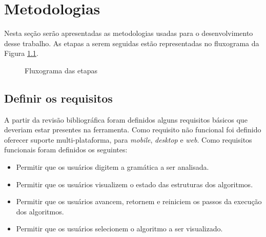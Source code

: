 \chapter{Metodologias}
\label{chap:metodologia}
Nesta seção serão apresentadas as metodologias usadas para o desenvolvimento desse trabalho. As etapas a serem seguidas estão representadas no fluxograma da Figura \ref{fig:etapas}.

\begin{figure}[ht]
  \centering
  \captionsetup{width=16cm}
  \caption{Fluxograma das etapas}
  \label{fig:etapas}
\end{figure}

\section{Definir os requisitos}
A partir da revisão bibliográfica foram definidos alguns requisitos básicos que deveriam estar presentes na ferramenta. Como requisito não funcional foi definido oferecer suporte multi-plataforma, para \textit{mobile}, \textit{desktop} e \textit{web}. Como requisitos funcionais foram definidos os seguintes:
\begin{itemize}[label={$\sbullet$}]
    \item Permitir que os usuários digitem a gramática a ser analisada.
    \item Permitir que os usuários visualizem o estado das estruturas dos algoritmos.
    \item Permitir que os usuários avancem, retornem e reiniciem os passos da execução dos algoritmos.  
    \item Permitir que os usuários selecionem o algoritmo a ser visualizado.
\end{itemize} 
 
